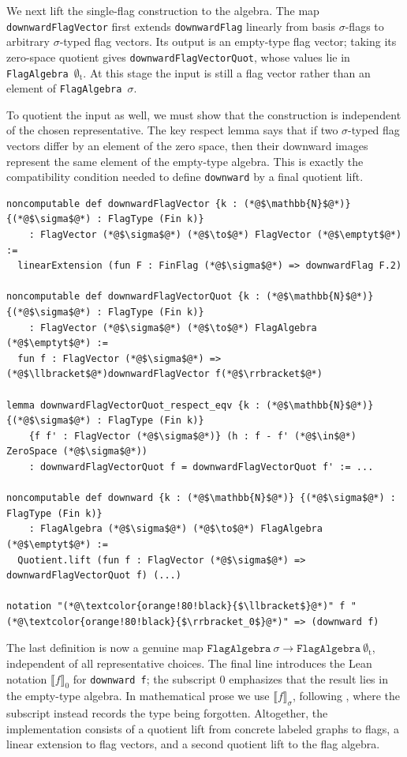 \documentclass{article}
\newcommand{\lean}[1]{\texttt{#1}}
\newcommand{\emptyt}{\emptyset_{\mathrm{t}}}
\begin{document}
We next lift the single-flag construction to the algebra.  The map
\lean{downwardFlagVector} first extends \lean{downwardFlag} linearly from basis
\(\sigma\)-flags to arbitrary $\sigma$-typed flag vectors.  Its output is an empty-type
flag vector; taking its zero-space quotient gives
\lean{downwardFlagVectorQuot}, whose values lie in
\lean{FlagAlgebra}~$\emptyt$.  At this stage the input is still a flag vector
rather than an element of \lean{FlagAlgebra}~$\sigma$.

To quotient the input as well, we must show that the construction is
independent of the chosen representative.  The key respect lemma says that if
two $\sigma$-typed flag vectors differ by an element of the zero space, then
their downward images represent the same element of the empty-type algebra.
This is exactly the compatibility condition needed to define \lean{downward}
by a final quotient lift.
\begin{lstlisting}
noncomputable def downwardFlagVector {k : (*@$\mathbb{N}$@*)} {(*@$\sigma$@*) : FlagType (Fin k)}
    : FlagVector (*@$\sigma$@*) (*@$\to$@*) FlagVector (*@$\emptyt$@*) :=
  linearExtension (fun F : FinFlag (*@$\sigma$@*) => downwardFlag F.2)

noncomputable def downwardFlagVectorQuot {k : (*@$\mathbb{N}$@*)} {(*@$\sigma$@*) : FlagType (Fin k)}
    : FlagVector (*@$\sigma$@*) (*@$\to$@*) FlagAlgebra (*@$\emptyt$@*) :=
  fun f : FlagVector (*@$\sigma$@*) => (*@$\llbracket$@*)downwardFlagVector f(*@$\rrbracket$@*)

lemma downwardFlagVectorQuot_respect_eqv {k : (*@$\mathbb{N}$@*)} {(*@$\sigma$@*) : FlagType (Fin k)}
    {f f' : FlagVector (*@$\sigma$@*)} (h : f - f' (*@$\in$@*) ZeroSpace (*@$\sigma$@*))
    : downwardFlagVectorQuot f = downwardFlagVectorQuot f' := ...

noncomputable def downward {k : (*@$\mathbb{N}$@*)} {(*@$\sigma$@*) : FlagType (Fin k)}
    : FlagAlgebra (*@$\sigma$@*) (*@$\to$@*) FlagAlgebra (*@$\emptyt$@*) :=
  Quotient.lift (fun f : FlagVector (*@$\sigma$@*) => downwardFlagVectorQuot f) (...)

notation "(*@\textcolor{orange!80!black}{$\llbracket$}@*)" f "(*@\textcolor{orange!80!black}{$\rrbracket_0$}@*)" => (downward f)
\end{lstlisting}
The last definition is now a genuine map
\(\lean{FlagAlgebra}~\sigma\to\lean{FlagAlgebra}~\emptyt\), independent of all
representative choices.  The final line introduces the Lean notation
\(\llbracket f\rrbracket_0\) for \lean{downward f}; the subscript $0$
emphasizes that the result lies in the empty-type algebra.  In mathematical
prose we use \(\llbracket f\rrbracket_\sigma\), following
, where the subscript instead records the type
being forgotten.  Altogether, the implementation consists of a quotient lift
from concrete labeled graphs to flags, a linear extension to flag vectors,
and a second quotient lift to the flag algebra.
\end{document}
